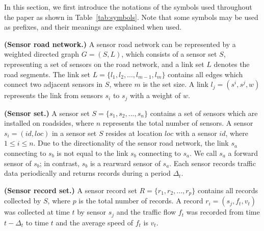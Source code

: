 In this section, we first introduce the notations of the symbols used throughout the paper as shown in Table~\ref{tab:symbols}. Note that some symbols may be used as prefixes, and their meanings are explained when used.

\begin{Definition} \textbf{(Sensor road network.)} 
A sensor road network can be represented by a weighted directed graph $G=(S,L)$, which consists of a sensor set $S$, representing a set of sensors on the road network, and a link set $L$ denotes the road segments. The link set $L = \{l_1, l_2, ... , l_{m-1}, l_m\}$ contains all edges which connect two adjacent sensors in $S$, where $m$ is the set size. A link $l_j = (s^i, s^j, w)$ represents the link from sensors $s_i$ to $s_j$ with a weight of $w$.
\end{Definition}

\begin{Definition} \textbf{(Sensor set.)}
A sensor set $S = \{ s_1, s_2,..., s_n \}$ contains a set of sensors which are installed on roadsides, where $n$ represents the total number of sensors. A sensor $s_i = (id, loc)$ in a sensor set $S$ resides at location $loc$ with a sensor $id$, where $1 \leq i \leq n$. Due to the directionality of the sensor road network, the link $s_a$ connecting to $s_b$ is not equal to the link $s_b$ connecting to $s_a$. We call $s_a$ a forward sensor of $s_b$; in contrast, $s_b$ is a rearward sensor of $s_a$. Each sensor records traffic data periodically and returns records during a period $\Delta_t$.
\end{Definition}

\begin{Definition} \textbf{(Sensor record set.)}
A sensor record set $R = \{r_1, r_2,...,r_p\}$ contains all records collected by $S$, where $p$ is the total number of records. A record $r_i = (s_j, f_t, v_t)$ was collected at time $t$ by sensor $s_j$ and the traffic flow $f_t$ was recorded from time $t-\Delta_t$ to time $t$ and the average speed of $f_t$ is $v_t$.
\end{Definition}

